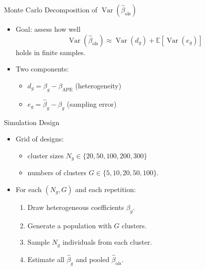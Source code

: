 \documentclass[
  ignorenonframetext,
]{beamer}
\providecommand{\tightlist}{%
  \setlength{\itemsep}{0pt}\setlength{\parskip}{0pt}}
\begin{document}
\begin{frame}{Monte Carlo Decomposition of
\(\operatorname{Var}(\hat{\beta}_{\text{ols}})\)}
\label{monte-carlo-decomposition-of-operatornamevarhatbeta_textols}
\begin{itemize}
\tightlist
\item
  Goal: assess how well \[
  \operatorname{Var}(\hat{\beta}_{\text{ols}})
  \approx
  \operatorname{Var}(d_g)
  +
  \mathbb{E}\!\left[ \operatorname{Var}(e_g) \right]
  \] holds in finite samples.
\item
  Two components:

  \begin{itemize}
  \tightlist
  \item
    \(d_g = \beta_g - \beta_{\text{APE}}\) (heterogeneity)
  \item
    \(e_g = \hat{\beta}_g - \beta_g\) (sampling error)
  \end{itemize}
\end{itemize}
\end{frame}

\begin{frame}{Simulation Design}
\label{simulation-design}
\begin{itemize}
\tightlist
\item
  Grid of designs:

  \begin{itemize}
  \tightlist
  \item
    cluster sizes \(N_g \in \{20, 50, 100, 200, 300\}\)\\
  \item
    numbers of clusters \(G \in \{5, 10, 20, 50, 100\}\).
  \end{itemize}
\item
  For each \((N_g, G)\) and each repetition:

  \begin{enumerate}
  \tightlist
  \item
    Draw heterogeneous coefficients \(\beta_g\).
  \item
    Generate a population with \(G\) clusters.
  \item
    Sample \(N_g\) individuals from each cluster.
  \item
    Estimate all \(\hat{\beta}_g\) and pooled
    \(\hat{\beta}_{\text{ols}}\).
  \end{enumerate}
\end{itemize}
\end{frame}
\end{document}
